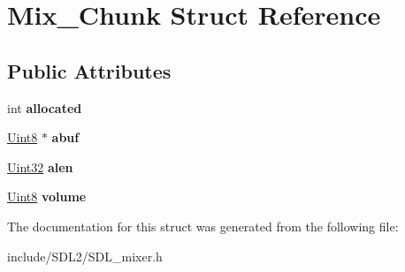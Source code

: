 \hypertarget{struct_mix___chunk}{}\section{Mix\+\_\+\+Chunk Struct Reference}
\label{struct_mix___chunk}
\subsection*{Public Attributes}
\begin{DoxyCompactItemize}
\item 
\mbox{\label{struct_mix___chunk_a7b985b90b5f97fffe34834116a281615}} 
int {\bfseries allocated}
\item 
\mbox{\label{struct_mix___chunk_a30b3b1a72677d076a1caa72422bb3774}} 
\hyperlink{_s_d_l__stdinc_8h_a2944638813a090aa23e62f4da842c3e2}{Uint8} $\ast$ {\bfseries abuf}
\item 
\mbox{\label{struct_mix___chunk_a958507964471fc4b9fa0d215f1852d05}} 
\hyperlink{_s_d_l__stdinc_8h_add440eff171ea5f55cb00c4a9ab8672d}{Uint32} {\bfseries alen}
\item 
\mbox{\label{struct_mix___chunk_afc566fd5da7f0ed1f3577f5bc0eac319}} 
\hyperlink{_s_d_l__stdinc_8h_a2944638813a090aa23e62f4da842c3e2}{Uint8} {\bfseries volume}
\end{DoxyCompactItemize}


The documentation for this struct was generated from the following file\+:\begin{DoxyCompactItemize}
\item 
include/\+S\+D\+L2/S\+D\+L\+\_\+mixer.\+h\end{DoxyCompactItemize}

